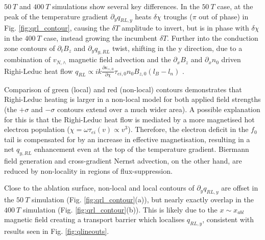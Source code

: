 \documentclass[aip,reprint]{revtex4-1}
\begin{document}
 $\SI{50}{T}$ and $\SI{400}{T}$ simulations show several key differences.  In the  $\SI{50}{T}$  case, at the peak of the temperature gradient  $\partial_y q_{RL,y}$ heats $\delta \chi $ troughs ($\pi$ out of phase) in Fig. \ref{fig:qrl_contour}, causing the $\delta T$ amplitude to invert, but is in phase with $\delta \chi$ in the $\SI{400}{T}$ case, instead growing the incumbent $\delta T$. Further into the conduction zone contours of $\partial_t B_{z}$ and $\partial_y q_{y,RL}$ twist, shifting in the y direction, due to a combination of $v_{N,\wedge}$ magnetic field advection and the $\partial_x B_{z}$ and $\partial_x n_0$ driven Righi-Leduc heat flow $q_{RL} \propto i k \frac{\partial \kappa_{\wedge,0}}{\partial \chi} \tau_{ei,0} n_0 B_{z,0}\left(l_B - l_n \right)$ .

Comparison of green (local) and red (non-local) contours  demonstrates that Righi-Leduc heating is larger in a non-local model for both applied field strengths (the $+\sigma$ and $-\sigma$ contours extend over a much wider area). A possible explanation for this is that the Righi-Leduc heat flow is mediated by a more magnetised hot electron population ($\chi = \omega \tau_{ei}(v) \propto v^3$). Therefore, the electron deficit in the $f_0$ tail is compensated for by an increase in effective magnetisation, resulting in a net $q_{y,RL}$ enhancement even at the top of the temperature gradient.   Biermann field generation and cross-gradient Nernst advection, on the other hand, are reduced by non-locality in regions of flux-suppression. 

Close to the ablation surface, non-local and local contours of $\partial_y q_{RL,y}$ are offset in the $\SI{50}{T}$ simulation (Fig. \ref{fig:qrl_contour}(a)), but nearly exactly overlap in the $\SI{400}{T}$ simulation (Fig. \ref{fig:qrl_contour}(b)). This is likely due to the $x\sim x_{abl}$ magnetic field creating a transport barrier which localises $q_{RL,y}$, consistent with results seen in Fig. \ref{fig:qlineouts}.
\end{document}

